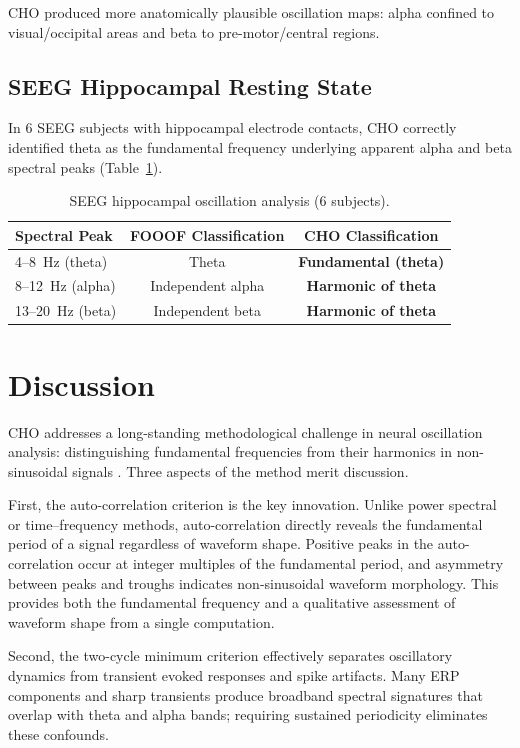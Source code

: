 \documentclass[11pt]{article}
\begin{document}
CHO produced more anatomically plausible oscillation maps: alpha confined to visual/occipital areas and beta to pre-motor/central regions.

\subsection{SEEG Hippocampal Resting State}

In 6 SEEG subjects with hippocampal electrode contacts, CHO correctly identified theta as the fundamental frequency underlying apparent alpha and beta spectral peaks (Table~\ref{tab:seeg}).

\begin{table}[H]
\centering
\caption{SEEG hippocampal oscillation analysis (6 subjects).}
\label{tab:seeg}
\begin{tabular}{@{}lcc@{}}
\toprule
Spectral Peak & FOOOF Classification & CHO Classification \\
\midrule
4--8~Hz (theta) & Theta & \textbf{Fundamental (theta)} \\
8--12~Hz (alpha) & Independent alpha & \textbf{Harmonic of theta} \\
13--20~Hz (beta) & Independent beta & \textbf{Harmonic of theta} \\
\bottomrule
\end{tabular}
\end{table}

\section{Discussion}

CHO addresses a long-standing methodological challenge in neural oscillation analysis: distinguishing fundamental frequencies from their harmonics in non-sinusoidal signals \citep{cole2017nonsinusoidal, pesaran2018investigating}. Three aspects of the method merit discussion.

First, the auto-correlation criterion is the key innovation. Unlike power spectral or time--frequency methods, auto-correlation directly reveals the fundamental period of a signal regardless of waveform shape. Positive peaks in the auto-correlation occur at integer multiples of the fundamental period, and asymmetry between peaks and troughs indicates non-sinusoidal waveform morphology. This provides both the fundamental frequency and a qualitative assessment of waveform shape from a single computation.

Second, the two-cycle minimum criterion effectively separates oscillatory dynamics from transient evoked responses and spike artifacts. Many ERP components and sharp transients produce broadband spectral signatures that overlap with theta and alpha bands; requiring sustained periodicity eliminates these confounds.
\end{document}

